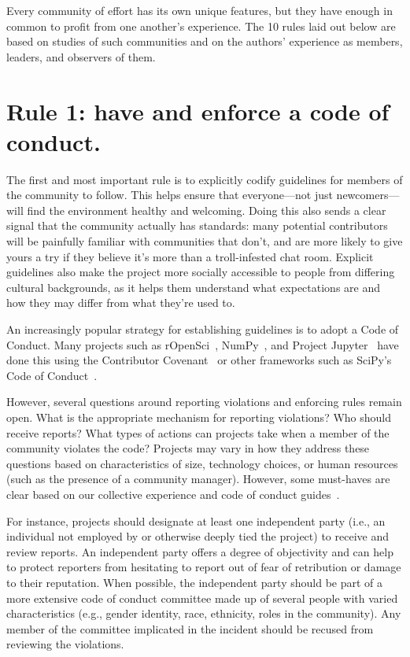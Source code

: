 \documentclass[10pt,letterpaper]{article}
\newcommand{\rulemajor}[1]{\section*{#1}}
\begin{document}
Every community of effort has its own unique features,
but they have enough in common to profit from one another's experience.
The 10 rules laid out below are based on studies of such communities
and on the authors' experience as members,
leaders,
and observers of them.

\rulemajor{Rule 1: have and enforce a code of conduct.}

The first and most important rule is
to explicitly codify guidelines for members of the community to follow.
This helps ensure that everyone---not just newcomers---will find the environment healthy and welcoming.
Doing this also sends a clear signal that the community actually has standards:
many potential contributors will be painfully familiar with communities that don't,
and are more likely to give yours a try if they believe
it's more than a troll-infested chat room.
Explicit guidelines also make the project more socially accessible to people from differing cultural backgrounds,
as it helps them understand what expectations are and how they may differ from what they're used to.

An increasingly popular strategy for establishing guidelines is to adopt a Code of Conduct.
Many projects such as rOpenSci~\cite{ropensci-coc},
NumPy~\cite{numpy-coc},
and Project Jupyter~\cite{jupyter-coc}
have done this using the Contributor Covenant~\cite{covenant}
or other frameworks such as SciPy's Code of Conduct~\cite{scipy-coc}.

However, several questions around reporting violations and enforcing rules remain open.
What is the appropriate mechanism for reporting violations?
Who should receive reports?
What types of actions can projects take when a member of the community violates the code?
Projects may vary in how they address these questions based on characteristics of size, technology choices, or human resources
(such as the presence of a community manager).
However, some must-haves are clear based on our collective experience and code of conduct guides~\cite{aurora2019}.

For instance,
projects should designate at least one independent party
(i.e., an individual not employed by or otherwise deeply tied the project)
to receive and review reports.
An independent party offers a degree of objectivity
and can help to protect reporters from hesitating to report out of fear of retribution or damage to their reputation.
When possible,
the independent party should be part of a more extensive code of conduct committee made up of several people with varied characteristics
(e.g., gender identity, race, ethnicity, roles in the community).
Any member of the committee implicated in the incident should be recused from reviewing the violations.
\end{document}
